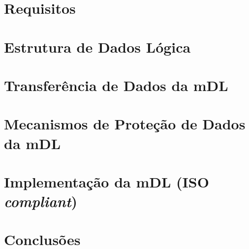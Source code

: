 \documentclass[11pt]{article}
\begin{document}
\section{Requisitos}


\section{Estrutura de Dados Lógica}


\section{Transferência de Dados da mDL}


\section{Mecanismos de Proteção de Dados da mDL}


\section{Implementação da mDL (ISO \textit{compliant})}


\newpage
\section{Conclusões}



\newpage


\end{document}
